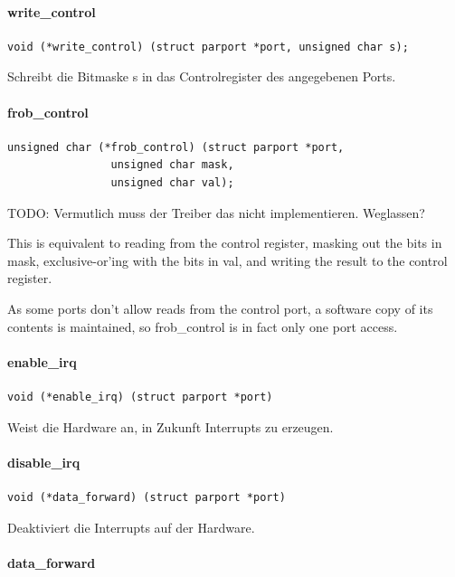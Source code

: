 \documentclass[a4paper,11pt]{article}
\begin{document}
\paragraph{write\_control}

\begin{verbatim}
void (*write_control) (struct parport *port, unsigned char s);
\end{verbatim}

Schreibt die Bitmaske s in das Controlregister des angegebenen Ports.

\paragraph{frob\_control}

\begin{verbatim}
unsigned char (*frob_control) (struct parport *port,
				unsigned char mask,
				unsigned char val);
\end{verbatim}

TODO: Vermutlich muss der Treiber das nicht implementieren. Weglassen?

This is equivalent to reading from the control register, masking out
the bits in mask, exclusive-or'ing with the bits in val, and writing
the result to the control register.

As some ports don't allow reads from the control port, a software copy
of its contents is maintained, so frob\_control is in fact only one
port access.

\paragraph{enable\_irq}

\begin{verbatim}
void (*enable_irq) (struct parport *port)
\end{verbatim}

Weist die Hardware an, in Zukunft Interrupts zu erzeugen.

\paragraph{disable\_irq}

\begin{verbatim}
void (*data_forward) (struct parport *port)
\end{verbatim}

Deaktiviert die Interrupts auf der Hardware.

\paragraph{data\_forward}
\end{document}
